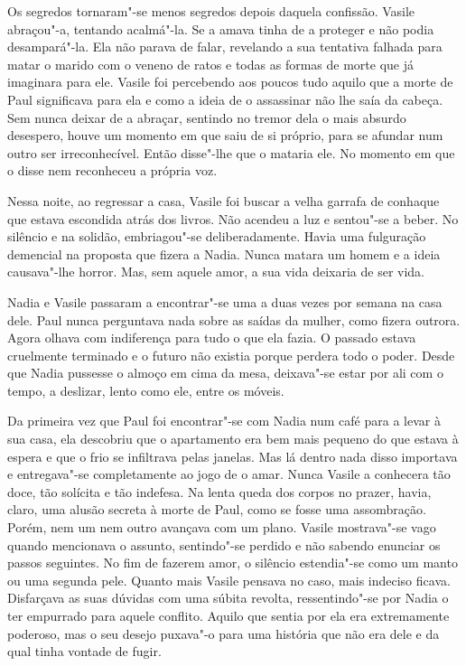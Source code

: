 Os segredos tornaram"-se menos segredos depois daquela confissão. Vasile
abraçou"-a, tentando acalmá"-la. Se a amava
tinha de a proteger e não podia desampará"-la. Ela não parava de falar,
revelando a sua tentativa falhada para matar o marido com o veneno de
ratos e todas as formas de morte que já imaginara para ele. Vasile foi
percebendo aos poucos tudo aquilo que a morte de Paul significava para
ela e como a ideia de o assassinar não lhe saía da cabeça. Sem nunca
deixar de a abraçar, sentindo no tremor dela o mais absurdo desespero,
houve um momento em que saiu de si próprio, para se afundar num outro
ser irreconhecível. Então disse"-lhe que o mataria ele. No momento em
que o disse nem reconheceu a própria voz.

Nessa noite, ao regressar a casa, Vasile foi buscar a velha garrafa de
conhaque que estava escondida atrás dos livros. Não acendeu a luz e
sentou"-se a beber. No silêncio e na solidão, embriagou"-se
deliberadamente. Havia uma fulguração demencial na proposta que fizera a
Nadia. Nunca matara um homem e a ideia causava"-lhe horror. Mas, sem
aquele amor, a sua vida deixaria de ser vida.

\bigskip

Nadia e Vasile passaram a encontrar"-se uma a duas vezes por semana na
casa dele. Paul nunca perguntava nada sobre as saídas da mulher, como
fizera outrora. Agora olhava com indiferença para tudo o que ela fazia.
O passado estava cruelmente terminado e o futuro não existia porque
perdera todo o poder. Desde que Nadia pussesse o almoço em cima da mesa,
deixava"-se estar por ali com o tempo, a deslizar, lento como ele, entre
os móveis.

Da primeira vez que Paul foi encontrar"-se com Nadia num café
para a levar à sua casa, ela descobriu que o apartamento era bem mais
pequeno do que estava à espera
e que o frio se infiltrava pelas janelas. Mas lá dentro nada disso
importava e entregava"-se completamente ao jogo de o amar. Nunca Vasile a
conhecera tão doce, tão solícita e tão indefesa. Na lenta queda dos
corpos no prazer, havia, claro, uma alusão secreta à morte de Paul, como
se fosse uma assombração. Porém, nem um nem outro avançava com um plano.
Vasile mostrava"-se vago quando mencionava o assunto, sentindo"-se
perdido e não sabendo enunciar os passos seguintes. No fim de fazerem
amor, o silêncio estendia"-se como um manto ou uma segunda pele. Quanto
mais Vasile pensava no caso, mais indeciso ficava. Disfarçava as suas
dúvidas com uma súbita revolta, ressentindo"-se por Nadia o ter empurrado para aquele conflito. Aquilo que sentia
por ela era extremamente poderoso, mas o seu desejo puxava"-o para uma
história que não era dele e da qual tinha vontade de fugir.

